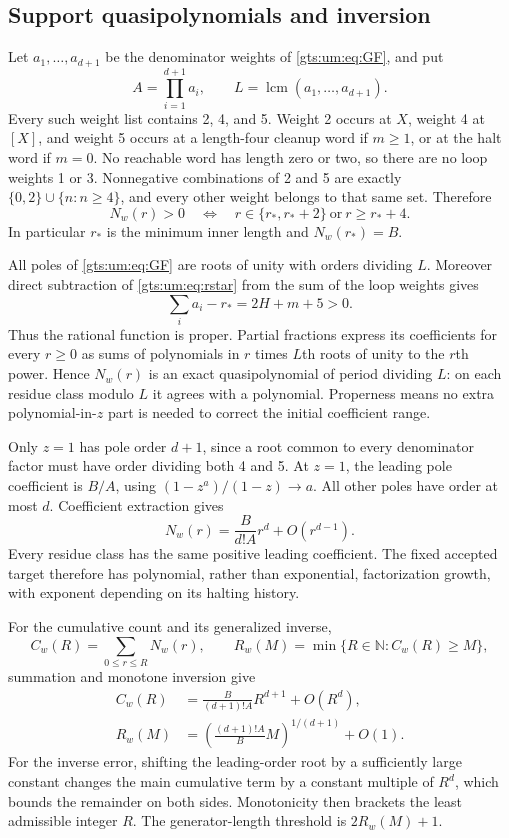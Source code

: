 \documentclass[11pt,letterpaper]{article}
\theoremstyle{definition}
\theoremstyle{remark}
\newcommand{\N}{\mathbb N}
\begin{document}
\subsection{Support quasipolynomials and inversion}
Let $a_1,\ldots,a_{d+1}$ be the denominator weights of \eqref{gts:um:eq:GF}, and put
\[
 A=\prod_{i=1}^{d+1}a_i,\qquad L=\operatorname{lcm}(a_1,\ldots,a_{d+1}).
\]
Every such weight list contains 2, 4, and 5. Weight 2 occurs at $X$, weight 4 at $[X]$, and weight 5 occurs at a length-four cleanup word if $m\geq1$, or at the halt word if $m=0$. No reachable word has length zero or two, so there are no loop weights 1 or 3. Nonnegative combinations of 2 and 5 are exactly $\{0,2\}\cup\{n:n\geq4\}$, and every other weight belongs to that same set. Therefore
\begin{equation}\label{gts:um:eq:support}
 N_w(r)>0\quad\Longleftrightarrow\quad
 r\in\{r_*,r_*+2\}\ \text{or}\ r\geq r_*+4.
\end{equation}
In particular $r_*$ is the minimum inner length and $N_w(r_*)=B$.

All poles of \eqref{gts:um:eq:GF} are roots of unity with orders dividing $L$. Moreover direct subtraction of \eqref{gts:um:eq:rstar} from the sum of the loop weights gives
\[
 \sum_i a_i-r_*=2H+m+5>0.
\]
Thus the rational function is proper. Partial fractions express its coefficients for every $r\geq0$ as sums of polynomials in $r$ times $L$th roots of unity to the $r$th power. Hence $N_w(r)$ is an exact quasipolynomial of period dividing $L$: on each residue class modulo $L$ it agrees with a polynomial. Properness means no extra polynomial-in-$z$ part is needed to correct the initial coefficient range.

Only $z=1$ has pole order $d+1$, since a root common to every denominator factor must have order dividing both 4 and 5. At $z=1$, the leading pole coefficient is $B/A$, using $(1-z^a)/(1-z)\to a$. All other poles have order at most $d$. Coefficient extraction gives
\begin{equation}\label{gts:um:eq:asymptotic}
 N_w(r)=\frac{B}{d!A}r^d+O(r^{d-1}).
\end{equation}
Every residue class has the same positive leading coefficient. The fixed accepted target therefore has polynomial, rather than exponential, factorization growth, with exponent depending on its halting history.

For the cumulative count and its generalized inverse,
\[
 C_w(R)=\sum_{0\leq r\leq R}N_w(r),\qquad
 R_w(M)=\min\{R\in\N:C_w(R)\geq M\},
\]
summation and monotone inversion give
\begin{align}
 C_w(R)&=\frac{B}{(d+1)!A}R^{d+1}+O(R^d),\label{gts:um:eq:cumulative}\\
 R_w(M)&=\left(\frac{(d+1)!A}{B}M\right)^{1/(d+1)}+O(1).
 \label{gts:um:eq:inverse}
\end{align}
For the inverse error, shifting the leading-order root by a sufficiently large constant changes the main cumulative term by a constant multiple of $R^d$, which bounds the remainder on both sides. Monotonicity then brackets the least admissible integer $R$. The generator-length threshold is $2R_w(M)+1$.
\end{document}
